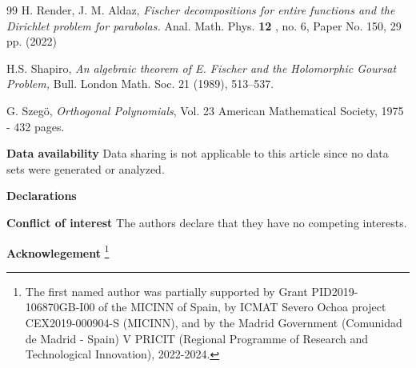\documentclass[12pt]{amsart}
\begin{document}
\begin{thebibliography}{99}
	 H. Render, J. M. Aldaz,  {\em Fischer decompositions for entire functions and the Dirichlet
	problem for parabolas.}   Anal. Math. Phys. \textbf{12} , no. 6, Paper No. 150, 29 pp. (2022) 
	
	
	
	 H.S. Shapiro, \emph{An algebraic theorem of E. Fischer and
		the Holomorphic Goursat Problem,} Bull. London Math. Soc. 21 (1989),
	513--537.
	
		
		 G. Szeg\"{o}, {\em Orthogonal Polynomials}, Vol. 23
		American Mathematical Society, 1975 - 432 pages.
	
\end{thebibliography}



\smallskip \noindent \textbf{Data availability} Data sharing is not
applicable to this article since no data sets were generated or analyzed.

\smallskip \noindent \textbf{Declarations}

\smallskip \noindent \textbf{Conflict of interest} The authors declare that
they have no competing interests.


\smallskip \noindent \textbf{Acknowlegement}  \thanks{The first named author was partially supported by Grant PID2019-106870GB-I00 of the MICINN of Spain,  by ICMAT Severo Ochoa project
	CEX2019-000904-S (MICINN), and by
	the Madrid Government (Comunidad de Madrid - Spain)  V PRICIT (Regional Programme of Research and Technological Innovation), 2022-2024.}
\end{document}
